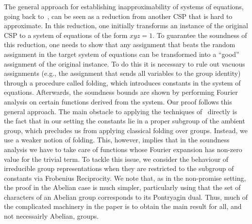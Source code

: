 \documentclass[a4paper,11pt]{article}
\theoremstyle{definition}
\begin{document}
The general approach for establishing inapproximability of systems of equations,
going back to~\cite{Hastad01:jacm,EHR04:tcs}, can be seen as a reduction from another CSP that is hard to approximate. In this reduction, one initially
transforms an instance of the original CSP to a system of equations of the
form $xyz=1$. To guarantee the soundness of this reduction, one needs to show that any
assignment that beats the random assignment in the target system of
equations can be transformed into a ``good'' assignment of the original
instance. To do this it is necessary to rule out vacuous assignments (e.g., the
assignment that sends all variables to the group identity) through a procedure
called folding, which introduces 
constants in the system of equations.
Afterwards, the soundness bounds are shown by performing Fourier analysis on
certain functions derived from the system.
%
Our proof follows this general approach. The main obstacle to
applying the techniques of~\cite{EHR04:tcs} directly is the fact that in our setting 
the constants lie in a proper subgroup of the
ambient group, which precludes us from applying classical folding over groups. Instead, we use a weaker notion of folding. This, however, implies that in the soundness analysis we have to take care of functions whose Fourier
expansion has non-zero value for the trivial term. To tackle this
issue, we consider the behaviour of irreducible group representations when they are
restricted to the subgroup of constants
via Frobenius Reciprocity.
%
We note that, as in the non-promise setting, the proof in the Abelian case is
much simpler, particularly using that the set of characters of an Abelian group
corresponds to its Pontryagin dual. Thus, much of the complicated machinery in
the paper is to obtain the main result for all, and not necessairly Abelian, groups.
\end{document}

